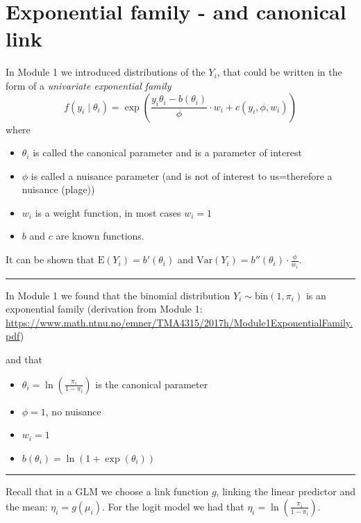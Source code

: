 \documentclass[
]{article}
\providecommand{\tightlist}{%
  \setlength{\itemsep}{0pt}\setlength{\parskip}{0pt}}
\begin{document}
\hypertarget{exponential-family---and-canonical-link}{%
\section{Exponential family - and canonical
link}\label{exponential-family---and-canonical-link}}

In Module 1 we introduced distributions of the \(Y_i\), that could be
written in the form of a \emph{univariate exponential family}
\[ f(y_i\mid \theta_i)=\exp \left( \frac{y_i \theta_i-b(\theta_i)}{\phi}\cdot w_i + c(y_i, \phi, w_i) \right) \]
where

\begin{itemize}
\item
  \(\theta_i\) is called the canonical parameter and is a parameter of
  interest
\item
  \(\phi\) is called a nuisance parameter (and is not of interest to
  us=therefore a nuisance (plage))
\item
  \(w_i\) is a weight function, in most cases \(w_i=1\)
\item
  \(b\) and \(c\) are known functions.
\end{itemize}

It can be shown that \(\text{E}(Y_i)=b'(\theta_i)\) and
\(\text{Var}(Y_i)=b''(\theta_i)\cdot \frac{\phi}{w_i}\).

\begin{center}\rule{0.5\linewidth}{0.5pt}\end{center}

In Module 1 we found that the binomial distribution
\(Y_i\sim \text{bin}(1,\pi_i)\) is an exponential family (derivation
from Module 1:
\url{https://www.math.ntnu.no/emner/TMA4315/2017h/Module1ExponentialFamily.pdf})

and that

\begin{itemize}
\tightlist
\item
  \(\theta_i=\ln( \frac{\pi_i}{1-\pi_i})\) is the canonical parameter
\item
  \(\phi=1\), no nuisance
\item
  \(w_i=1\)
\item
  \(b(\theta_i)=\ln(1+\exp(\theta_i))\)
\end{itemize}

\begin{center}\rule{0.5\linewidth}{0.5pt}\end{center}

Recall that in a GLM we choose a link function \(g\), linking the linear
predictor and the mean: \(\eta_i=g(\mu_i)\). For the logit model we had
that \(\eta_i=\ln(\frac{\pi_i}{1-\pi_i})\).
\end{document}
